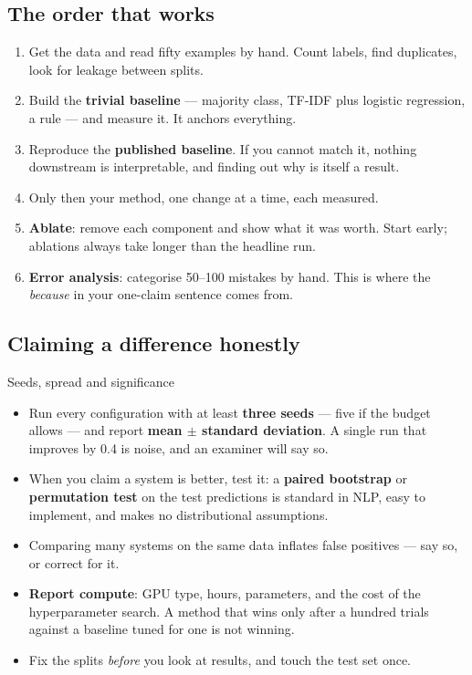 \documentclass[11pt,a4paper]{article}
\begin{document}
\subsection{The order that works}

\begin{enumerate}
  \item Get the data and read fifty examples by hand. Count labels, find
        duplicates, look for leakage between splits.
  \item Build the \textbf{trivial baseline} --- majority class, TF-IDF plus
        logistic regression, a rule --- and measure it. It anchors everything.
  \item Reproduce the \textbf{published baseline}. If you cannot match it,
        nothing downstream is interpretable, and finding out why is itself a
        result.
  \item Only then your method, one change at a time, each measured.
  \item \textbf{Ablate}: remove each component and show what it was worth.
        Start early; ablations always take longer than the headline run.
  \item \textbf{Error analysis}: categorise 50--100 mistakes by hand. This is
        where the \emph{because} in your one-claim sentence comes from.
\end{enumerate}

\subsection{Claiming a difference honestly}

\begin{cbox}{Seeds, spread and significance}
\begin{itemize}
  \item Run every configuration with at least \textbf{three seeds} --- five if
        the budget allows --- and report \textbf{mean $\pm$ standard
        deviation}. A single run that improves by 0.4 is noise, and an
        examiner will say so.
  \item When you claim a system is better, test it: a \textbf{paired bootstrap}
        or \textbf{permutation test} on the test predictions is standard in
        NLP, easy to implement, and makes no distributional assumptions.
  \item Comparing many systems on the same data inflates false positives ---
        say so, or correct for it.
  \item \textbf{Report compute}: GPU type, hours, parameters, and the cost of
        the hyperparameter search. A method that wins only after a hundred
        trials against a baseline tuned for one is not winning.
  \item Fix the splits \emph{before} you look at results, and touch the test
        set once.
\end{itemize}
\end{cbox}
\end{document}
